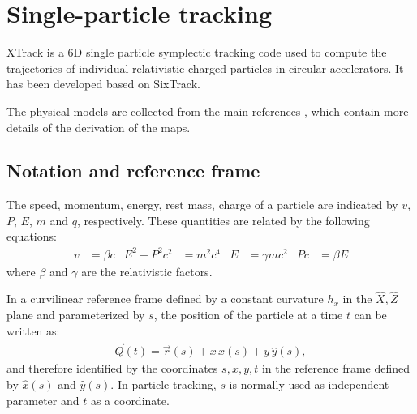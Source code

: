 \chapter{Single-particle tracking}

XTrack is a 6D single particle symplectic tracking code used to compute the
trajectories of individual relativistic charged particles in circular
accelerators. It has been developed based on SixTrack.

The physical models are collected from the main references
\cite{ripken85,barber87,ripken95,heinemann95,barber96,beam_beam,rf_multipoles},
which contain more details of the derivation of the maps.


\section{Notation and reference frame}

The speed, momentum, energy, rest mass, charge of a particle are indicated
by $v$, $P$, $E$, $m$ and $q$, respectively.  These quantities are
related by the following equations:
\begin{align}
  v&=\beta c &
  E^2-P^2c^2&=m^2c^4 &
  E & = \gamma mc^2 &
  Pc & =\beta E
\end{align}
where $\beta$ and $\gamma$ are the relativistic factors.

In a curvilinear reference frame defined by a constant curvature $h_x$ in the
$\hat X, \hat Z$ plane and parameterized by $s$, the
position of the particle at a time $t$ can be written as:
\begin{align}
  \vec Q(t)= \vec r(s) + x \,\hat x(s) + y\, \hat y(s),
\end{align}
and therefore identified by the coordinates $s, x, y, t$ in the reference frame
defined by $\hat x(s)$ and $\hat y(s)$. In particle tracking, $s$ is normally
used as independent parameter and $t$ as a coordinate.

